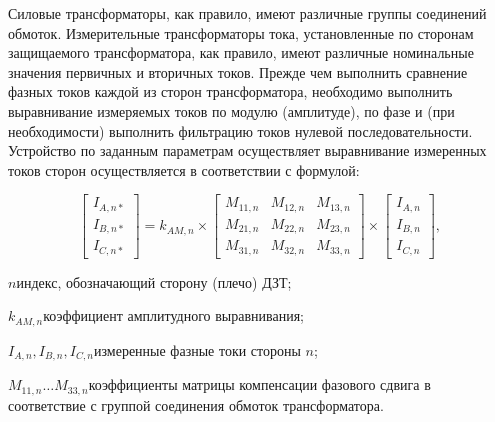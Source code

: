 
\begin{flushleft}
\color{black}
\nopagebreak
\end{flushleft}

Силовые трансформаторы, как правило, имеют различные группы соединений обмоток. Измерительные трансформаторы тока, установленные по сторонам защищаемого трансформатора, как правило, имеют различные номинальные значения первичных и вторичных токов. Прежде чем выполнить сравнение фазных токов каждой из сторон трансформатора,  необходимо выполнить выравнивание измеряемых токов по модулю (амплитуде), по фазе и (при необходимости) выполнить фильтрацию токов нулевой последовательности.
Устройство по заданным параметрам осуществляет выравнивание измеренных токов сторон осуществляется в соответствии с формулой:

\begin{equation*}
\begin{bmatrix}
I_{A,n*}\\ 
I_{B,n*}\\ 
I_{C,n*}
\end{bmatrix}= k_{AM,n}\times \begin{bmatrix}
M_{11,n} & M_{12,n} & M_{13,n}\\ 
M_{21,n} & M_{22,n} & M_{23,n}\\ 
M_{31,n} & M_{32,n} & M_{33,n}
\end{bmatrix}\times \begin{bmatrix}
I_{A,n}\\ 
I_{B,n}\\ 
I_{C,n}
\end{bmatrix},
\end{equation*}
\begin{eqexpl}[25mm]
\item{$n$}индекс, обозначающий сторону (плечо) ДЗТ;
\item{$k_{AM,n}$}коэффициент амплитудного выравнивания;
\item{$I_{A,n},I_{B,n},I_{C,n}$}измеренные фазные токи стороны $n$;
\item{$M_{11,n}\dots M_{33,n} $}коэффициенты матрицы компенсации фазового сдвига в соответствие  с группой соединения обмоток трансформатора.
\end{eqexpl}

